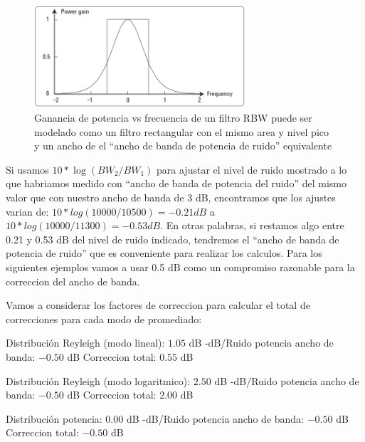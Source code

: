 \documentclass[a4paper,12pt,twoside]{article}
\newcommand{\quotes}[1]{``#1''}
\begin{document}
\begin{figure}[H]
    \includegraphics[width=0.7\textwidth]{../img/modelado.png}
        \caption{Ganancia de potencia vs frecuencia de un filtro RBW puede ser modelado como un filtro rectangular con el mismo area y nivel pico y un ancho de el \quotes{ancho de banda de potencia de ruido} equivalente}
        \label{modelo}
\end{figure}

Si usamos $10*\log(BW_{2}/BW_{1})$ para ajustar el nivel de ruido mostrado a lo que habriamos medido con \quotes{ancho de banda de potencia del ruido} del mismo valor que con nuestro ancho de banda de 3 dB, encontramos que los ajustes varian de: $10*log(10000/10500) = -0.21dB$ a $10*log(10000/11300)=-0.53 dB$. En otras palabras, si restamos algo entre 0.21 y 0.53 dB del nivel de ruido indicado, tendremos el \quotes{ancho de banda de potencia de ruido} que es conveniente para realizar los calculos. Para los siguientes ejemplos vamos a usar 0.5 dB como un compromiso razonable para la correccion del ancho de banda.
\newline

Vamos a considerar los factores de correccion para calcular el total de correcciones para cada modo de promediado:
\newline

\newline
Distribución Reyleigh (modo lineal): $1.05$ dB -dB/Ruido potencia ancho de banda:  $-0.50$ dB \newline
Correccion total: $0.55$ dB
\newline

\newline
Distribución Reyleigh (modo logaritmico): $2.50$ dB -dB/Ruido potencia ancho de banda:  $-0.50$ dB \newline
Correccion total: $2.00$ dB
\newline
  
\newline
Distribución potencia: $0.00$ dB -dB/Ruido potencia ancho de banda:  $-0.50$ dB \newline
Correccion total: $-0.50$ dB
\end{document}
